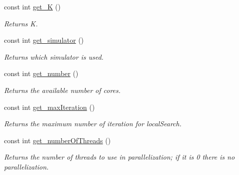 \begin{DoxyCompactItemize}
$$const int \hyperlink{classoptJrParameters_a8274b4a95698ce1681147fdddbced0d8}{get\-\_\-\-K} ()
\begin{DoxyCompactList}\small\item\em Returns K. \end{DoxyCompactList}\item 
const int \hyperlink{classoptJrParameters_a199e3fc83f3efb82fc63796a540d6589}{get\-\_\-simulator} ()
\begin{DoxyCompactList}\small\item\em Returns which simulator is used. \end{DoxyCompactList}\item 
const int \hyperlink{classoptJrParameters_a9bb0e783bd6bf555e86cea874f13cb4f}{get\-\_\-number} ()
\begin{DoxyCompactList}\small\item\em Returns the available number of cores. \end{DoxyCompactList}\item 
const int \hyperlink{classoptJrParameters_a73340961e894748c6c143284e0b278fa}{get\-\_\-max\-Iteration} ()
\begin{DoxyCompactList}\small\item\em Returns the maximum number of iteration for local\-Search. \end{DoxyCompactList}\item 
const int \hyperlink{classoptJrParameters_a6654c5bb36a825393e759b2824444bbb}{get\-\_\-number\-Of\-Threads} ()
\begin{DoxyCompactList}\small\item\em Returns the number of threads to use in parallelization; if it is 0 there is no parallelization. \end{DoxyCompactList}\end{DoxyCompactItemize}
